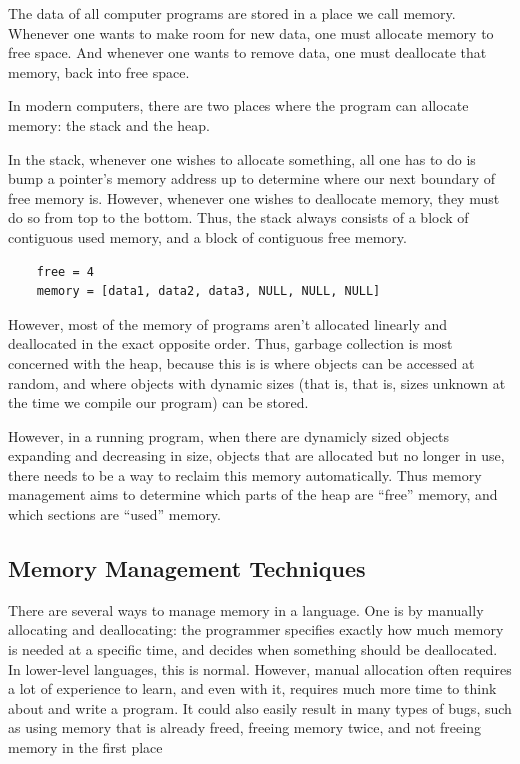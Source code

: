 \documentclass[index]{subfiles}
\begin{document}
The data of all computer programs are stored in a place we call memory. Whenever one wants to make room for new data, one must allocate memory to free space. And whenever one wants to remove data, one must deallocate that memory, back into free space.

In modern computers, there are two places where the program can allocate memory: the stack and the heap\cite{the_rust_programming_language}.

In the stack, whenever one wishes to allocate something, all one has to do is bump a pointer's memory address up to determine where our next boundary of free memory is\cite[Chapter~4.1~What~is~Ownership?]{the_rust_programming_language}. However, whenever one wishes to deallocate memory, they must do so from top to the bottom. Thus, the stack always consists of a block of contiguous used memory, and a block of contiguous free memory.

\begin{verbatim}
    free = 4
    memory = [data1, data2, data3, NULL, NULL, NULL]
\end{verbatim}

However, most of the memory of programs aren't allocated linearly and deallocated in the exact opposite order. Thus, garbage collection is most concerned with the heap, because this is is where objects can be accessed at random, and where objects with dynamic sizes (that is, that is, sizes unknown at the time we compile our program) can be stored. 

However, in a running program, when there are dynamicly sized objects expanding and decreasing in size, objects that are allocated but no longer in use, there needs to be a way to reclaim this memory automatically. Thus memory management aims to determine which parts of the heap are ``free'' memory, and which sections are ``used'' memory.

\subsection{Memory Management Techniques}

There are several ways to manage memory in a language. One is by manually allocating and deallocating: the programmer specifies exactly how much memory is needed at a specific time, and decides when something should be deallocated. In lower-level languages, this is normal. However, manual allocation often requires a lot of experience to learn, and even with it, requires much more time to think about and write a program. It could also easily result in many types of bugs, such as using memory that is already freed, freeing memory twice, and not freeing memory in the first place \cites{garbage_collection_overview_uw}[Chapter~1]{gc_handbook}
\end{document}

